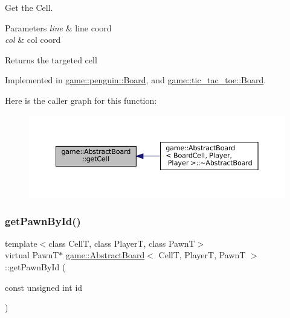 Get the Cell. 


\begin{DoxyParams}{Parameters}
{\em line} & line coord \\
\hline
{\em col} & col coord \\
\hline
\end{DoxyParams}
\begin{DoxyReturn}{Returns}
the targeted cell 
\end{DoxyReturn}


Implemented in \hyperlink{classgame_1_1penguin_1_1_board_ac9fbe04a302208fcb5f66e717182b6d4}{game\+::penguin\+::\+Board}, and \hyperlink{classgame_1_1tic__tac__toe_1_1_board_ab5c00479b4dabd60bef9ea00fce23779}{game\+::tic\+\_\+tac\+\_\+toe\+::\+Board}.

Here is the caller graph for this function\+:
\nopagebreak
\begin{figure}[H]
\begin{center}
\leavevmode
\includegraphics[width=350pt]{classgame_1_1_abstract_board_af02030d0ae3f44b95fff7c8012e7a066_icgraph}
\end{center}
\end{figure}
\mbox{\label{classgame_1_1_abstract_board_a5d80fa5f0809c746349fc1bab1d8999b}} 
\subsubsection{\texorpdfstring{get\+Pawn\+By\+Id()}{getPawnById()}}
{\footnotesize\ttfamily template$<$class CellT, class PlayerT, class PawnT$>$ \\
virtual PawnT$\ast$ \hyperlink{classgame_1_1_abstract_board}{game\+::\+Abstract\+Board}$<$ CellT, PlayerT, PawnT $>$\+::get\+Pawn\+By\+Id (\begin{DoxyParamCaption}\item[{const unsigned int}]{id }\end{DoxyParamCaption})\hspace{0.3cm}{\ttfamily [pure virtual]}}



